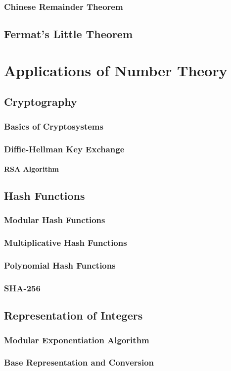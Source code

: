 \documentclass[oneside]{book}
\begin{document}
\subsection{Chinese Remainder Theorem}
\section{Fermat's Little Theorem}

\chapter{Applications of Number Theory}
\section{Cryptography}
\subsection{Basics of Cryptosystems}
\subsection{Diffie-Hellman Key Exchange}
\subsubsection{RSA Algorithm}
\section{Hash Functions}
\subsection{Modular Hash Functions}
\subsection{Multiplicative Hash Functions}
\subsection{Polynomial Hash Functions}
\subsection{SHA-256}
\section{Representation of Integers}
\subsection{Modular Exponentiation Algorithm}
\subsection{Base Representation and Conversion}

\nocite{*}
\printbibliography
\end{document}
